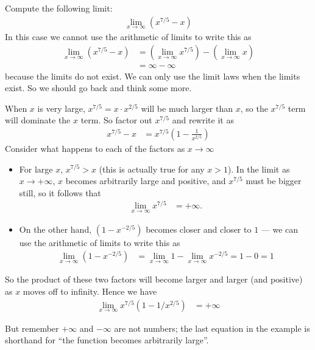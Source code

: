 \begin{eg}\label{eg_1_5_3}
Compute the following limit:
\begin{align*}
  \lim_{x \to \infty} \left( x^{7/5}-x \right)
\end{align*}
In this case we cannot use the arithmetic of limits to write this as
\begin{align*}
  \lim_{x \to \infty} \left( x^{7/5}-x \right)
  &= \left( \lim_{x \to \infty} x^{7/5}\right)
  - \left( \lim_{x \to \infty} x \right) \\
  &= \infty -\infty
\end{align*}
because the limits do not exist. We can only use the limit laws when the limits
exist. So we should go back and think some more.

When $x$ is very large, $x^{7/5} = x\cdot x^{2/5}$ will be much larger than $x$, so the
$x^{7/5}$ term will dominate the $x$ term. So factor out $x^{7/5}$ and rewrite it as
\begin{align*}
  x^{7/5}-x &= x^{7/5} \left(1 - \frac{1}{x^{2/5}} \right)
\end{align*}
Consider what happens to each of the factors as $x \to \infty$
\begin{itemize}
 \item For large $x$, $x^{7/5}>x$ (this is actually true for any $x>1$).
In the limit as $x \to +\infty$, $x$ becomes arbitrarily large and
positive, and $x^{7/5}$ must be bigger still, so it follows that
\begin{align*}
  \lim_{x \to \infty} x^{7/5} &= + \infty.
\end{align*}
 \item On the other hand, $(1-x^{-2/5})$ becomes closer and closer to $1$ ---
we can use the arithmetic of limits to write this as
\begin{align*}
  \lim_{x \to \infty} (1-x^{-2/5}) &= \lim_{x \to \infty} 1 - \lim_{x \to
\infty} x^{-2/5} = 1-0 = 1
\end{align*}
\end{itemize}
So the product of these two factors will become larger and larger (and
positive) as $x$ moves off to infinity. Hence we have
\begin{align*}
  \lim_{x \to \infty} x^{7/5} \left(1 - 1/x^{2/5} \right) &= + \infty
\end{align*}
\end{eg}
But remember $+\infty$ and $-\infty$ are not numbers; the last equation in the example is
shorthand for ``the function becomes arbitrarily large''.

